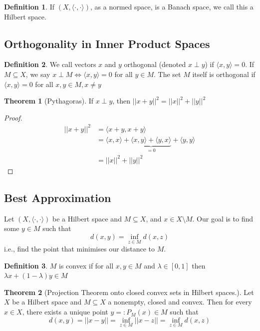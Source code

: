 \documentclass[11pt,a4paper]{article}
\theoremstyle{definition}
\newtheorem{definition}{Definition}[section]
\newtheorem{theorem}{Theorem}[section]
\begin{document}
\begin{definition}
    If $(X, \langle \cdot ,\cdot \rangle )$, as a normed space, is a Banach space, we call this a Hilbert space.
\end{definition}

\subsection*{Orthogonality in Inner Product Spaces}

\begin{definition}
    We call vectors $x$ and $y$ orthogonal (denoted $x \perp y$) if $\langle x,y \rangle = 0$. If $M \subseteq X$, we say $x \perp M \iff \langle x,y \rangle = 0$ for all $y \in M$. The set $M$ itself is orthogonal if $\langle x,y\rangle = 0$ for all $x,y \in M, x \ne y$
\end{definition}

\begin{theorem}[Pythagoras]
    If $x \perp y$, then $||x+y||^2 = ||x||^2 + ||y||^2$
\end{theorem}

\begin{proof}
    \begin{align*}
        ||x+y||^2 & = \langle x+y,x+y\rangle \\
        & = \langle x,x \rangle + \underbrace{\langle x,y \rangle + \langle y,x \rangle}_{=0} + \langle y,y \rangle \\
        & = ||x||^2 + ||y||^2
    \end{align*}
\end{proof}

\subsection*{Best Approximation}
Let $(X, \langle \cdot , \cdot \rangle )$ be a Hilbert space and $M \subseteq X$, and $ x \in X \setminus M$. Our goal is to find some $ y \in M$ such that \[d(x,y) = \inf \limits _{z \in M} d(x,z)\]i.e., find the point that minimises our distance to $M$.

\begin{definition}
    $M$ is convex if for all $x,y \in M$ and $\lambda \in [0,1]$ then $\lambda x + (1-\lambda )y \in M$
\end{definition}

\begin{theorem}[Projection Theorem onto closed convex sets in Hilbert spaces.]
    Let $X$ be a Hilbert space and $M \subseteq X$ a nonempty, closed and convex. Then for every $x \in X$, there exists a unique point $y =: P_M(x) \in M$ such that \[
    d(x,y) = ||x-y|| = \inf \limits _{z \in M} ||x-z|| = \inf \limits _{z \in M} d(x,z)
    \]
\end{theorem}
\end{document}
